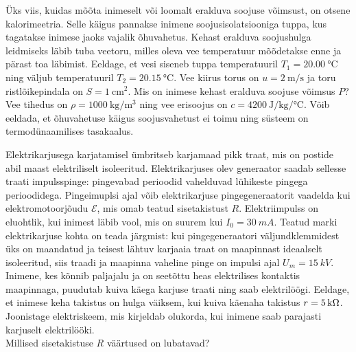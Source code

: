 \documentclass[10pt]{article}
\begin{document}

Üks viis, kuidas mõõta inimeselt või loomalt eralduva soojuse võimsust, on otsene kalorimeetria. Selle käigus pannakse inimene soojusisolatsiooniga tuppa, kus tagatakse inimese jaoks vajalik õhuvahetus. Kehast eralduva soojushulga leidmiseks läbib tuba veetoru, milles oleva vee temperatuur mõõdetakse enne ja pärast toa läbimist. Eeldage, et vesi siseneb tuppa temperatuuril $T_1 = \SI{20.00}{\celsius}$ ning väljub temperatuuril $T_2 = \SI{20.15}{\celsius}$. Vee kiirus torus on $u = \SI{2}{\meter\per\second}$ ja toru ristlõikepindala on $S=\SI{1}{\cm\squared}$. Mis on inimese kehast eralduva soojuse võimsus $P$? Vee tihedus on $\rho = \SI{1000}{\kg\per\meter\cubed}$ ning vee erisoojus on $c = \SI{4200}{\joule\per\kilogram\per\celsius}$. Võib eeldada, et õhuvahetuse käigus soojusvahetust ei toimu ning süsteem on termodünaamilises tasakaalus.
\probend
\bigskip


Elektrikarjusega karjatamisel ümbritseb karjamaad pikk traat, mis on postide abil maast elektriliselt isoleeritud. Elektrikarjuses olev generaator saadab sellesse traati impulsspinge: pingevabad perioodid vahelduvad lühikeste pingega perioodidega. Pingeimuplsi ajal võib elektrikarjuse pingegeneraatorit vaadelda kui elektromotoorjõudu $\mathcal E$, mis omab teatud sisetakistust $R$. Elektriimpulss on eluohtlik, kui inimest läbib vool, mis on suurem kui $I_0=\SI{30}{mA}$. Teatud marki elektrikarjuse kohta on teada järgmist: kui pingegeneraatori väljundklemmidest üks on maandatud ja teisest lähtuv karjaaia traat on maapinnast ideaalselt isoleeritud, siis traadi ja maapinna vaheline pinge on impulsi ajal $U_m=\SI{15}{kV}$. Inimene, kes kõnnib paljajalu ja on seetõttu heas elektrilises kontaktis maapinnaga, puudutab kuiva käega karjuse traati ning saab elektrilöögi. Eeldage, et inimese keha takistus on hulga väiksem, kui kuiva käenaha takistus $r=\SI 5\kohm$.\\
\osa Joonistage elektriskeem, mis kirjeldab olukorda, kui inimene saab parajasti karjuselt elektrilööki.\\
\osa Millised sisetakistuse $R$ väärtused on lubatavad?
\probend
\bigskip
\end{document}

